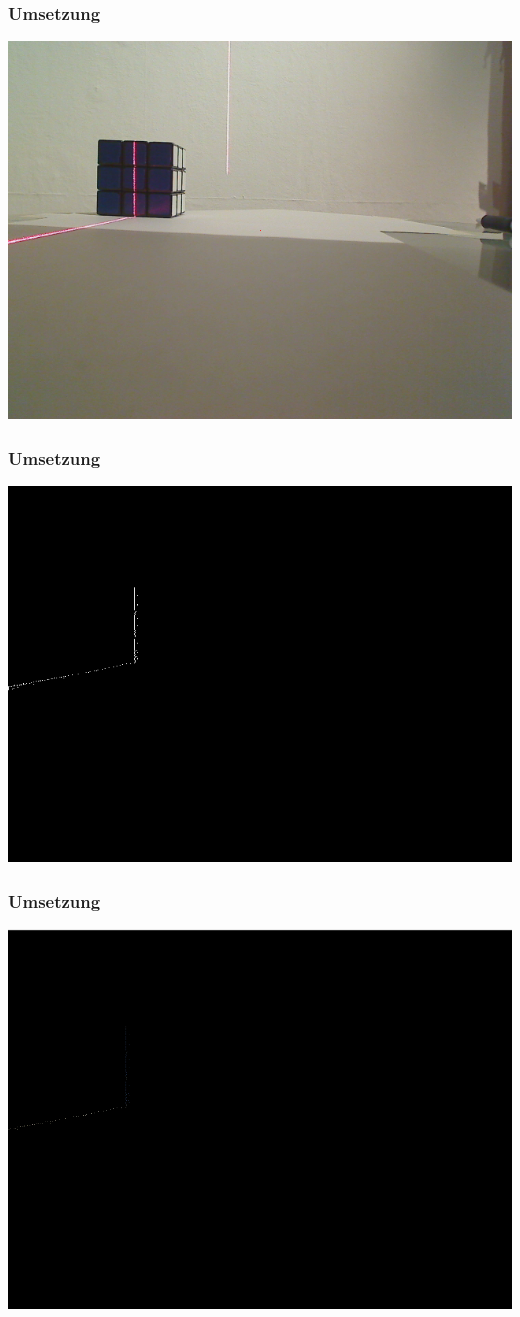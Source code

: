 \documentclass[xcolor=dvipsnames]{beamer}
\begin{document}
\begin{frame}
	\frametitle{Umsetzung}

	\includegraphics[width=0.9\linewidth]{includes/cap.png}

\end{frame}
\begin{frame}
	\frametitle{Umsetzung}

	\includegraphics[width=0.9\linewidth]{includes/line.png}

\end{frame}
\begin{frame}
	\frametitle{Umsetzung}

	\includegraphics[width=0.9\linewidth]{includes/3d.png}

\end{frame}
\end{document}
